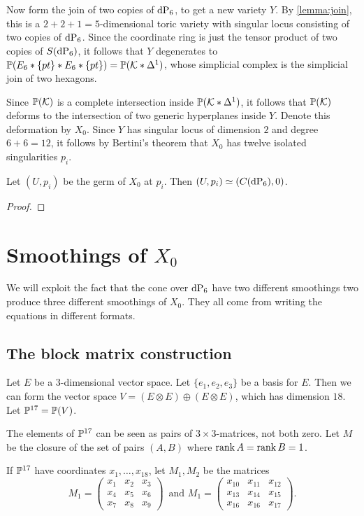 Now form the join of two copies of $\dP6$, to get a new variety $Y$. By \cref{lemma:join}, this is a $2+2+1=5$-dimensional toric variety with singular locus consisting of two copies of $\dP6$. Since the coordinate ring is just the tensor product of two copies of $S(\dP6)$, it follows that $Y$ degenerates to $\P(E_6 \ast \{pt\} \ast E_6 \ast \{ pt \})=\P(\K \ast \Delta^1)$, whose simplicial complex is the simplicial join of two hexagons. 

Since $\P(\K)$ is a complete intersection inside $\P(\K \ast \Delta^1)$,  it follows that $\P(\K)$ deforms to the intersection of two generic hyperplanes inside $Y$. Denote this deformation by $X_0$. Since $Y$ has singular locus of dimension $2$ and degree $6+6=12$, it follows by Bertini's theorem that $X_0$ has twelve isolated singularities $p_i$.

\begin{lemma}
Let $(U,p_i)$ be the germ of $X_0$ at $p_i$. Then $(U,p_i) \simeq (C(\dP6),0)$.
\end{lemma}
\begin{proof}
\end{proof}


\section[Smoothings of X0]{Smoothings of $X_0$}

We will exploit the fact that the cone over $\dP6$ have two different smoothings two produce three different smoothings of $X_0$. They all come from writing the equations in different formats.

\subsection{The block matrix construction}

Let $E$ be a 3-dimensional vector space. Let $\{e_1,e_2,e_3\}$ be a basis for $E$. Then we can form the vector space $V= (E \otimes E) \oplus (E \otimes E)$, which has dimension $18$. Let $\P^{17}=\P(V)$.

The elements of $\P^{17}$ can be seen as pairs of $3 \times 3$-matrices, not both zero. Let $M$ be the closure of the set of pairs $(A,B)$ where $\rank A = \rank B = 1$.  

If $\P^{17}$ have coordinates $x_1,\ldots,x_{18}$, let $M_1, M_2$ be the matrices
\[
M_1 = \begin{pmatrix}
x_1 & x_2 & x_3 \\
x_4 & x_5 & x_6 \\
x_7 & x_8 & x_9 
\end{pmatrix}\,
\text{ and }
M_1 = \begin{pmatrix}
x_{10} & x_{11} & x_{12} \\
x_{13} & x_{14} & x_{15} \\
x_{16} & x_{16} & x_{17}
\end{pmatrix}.
\]

